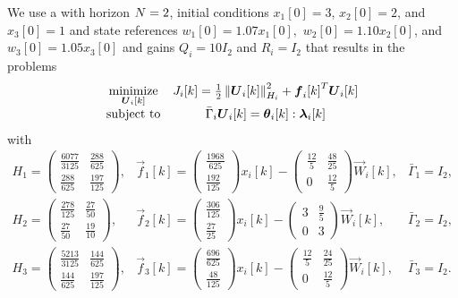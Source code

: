 \documentclass[../main.tex]{subfiles}
\begin{document}
We use a \dmpc{} with horizon ${N=2}$,
initial conditions
${x_{1}[0]=3}$,
${x_{2}[0]=2}$, and
${x_{3}[0]=1}$
and state references
${w_{1}[0]=1.07x_{1}[0]},$
${w_{2}[0]=1.10x_{2}[0]}$, and
${w_{3}[0]=1.05x_{3}[0]}$
and gains
$Q_{i}=10I_{2}$ and
$R_{i}=   I_{2}$
that results in the problems
\begin{equation}
  \begin{matrix}
    \underset{\vec{U}_{i}[k]}{\mathrm{minimize}}&\obji=\frac{1}{2}\norm{\vec{U}_{i}[k]}^{2}_{H_{i}} + {\vec{f}_{i}[k]}^{T}\vec{U}_{i}[k]\\
    \mathrm{subject~ to} & \bar{\Gamma}_{i}\vec{U}_{i}[k] = \thetaik:\lambdaik
  \end{matrix}
  \label{eq:example_local_problem}
\end{equation}
with
\begin{equation}
  \label{eq:1}
  \begin{array}{lll}
H_1=\left(\begin{array}{cc} \frac{6077}{3125} & \frac{288}{625}\\ \frac{288}{625} & \frac{197}{125} \end{array}\right), & \vec{f}_1[k]=\left(\begin{array}{c} \frac{1968}{625}\\ \frac{192}{125} \end{array}\right)x_i[k]-\left(\begin{array}{cc} \frac{12}{5} & \frac{48}{25}\\ 0 & \frac{12}{5} \end{array}\right)\vec{W}_i[k], & \bar{\Gamma}_1=I_2,\\
H_2=\left(\begin{array}{cc} \frac{278}{125} & \frac{27}{50}\\ \frac{27}{50} & \frac{19}{10} \end{array}\right), & \vec{f}_2[k]=\left(\begin{array}{c} \frac{306}{125}\\ \frac{27}{25} \end{array}\right)x_i[k]-\left(\begin{array}{cc} 3 & \frac{9}{5}\\ 0 & 3 \end{array}\right)\vec{W}_i[k], & \bar{\Gamma}_2=I_2,\\
H_3=\left(\begin{array}{cc} \frac{5213}{3125} & \frac{144}{625}\\ \frac{144}{625} & \frac{197}{125} \end{array}\right), & \vec{f}_3[k]=\left(\begin{array}{c} \frac{696}{625}\\ \frac{48}{125} \end{array}\right)x_i[k]-\left(\begin{array}{cc} \frac{12}{5} & \frac{24}{25}\\ 0 & \frac{12}{5} \end{array}\right)\vec{W}_i[k], & \bar{\Gamma}_3=I_2.\\
  \end{array}
\end{equation}
\end{document}
